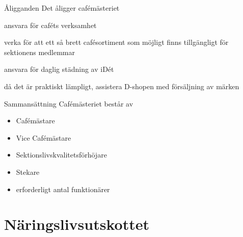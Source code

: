 \documentclass[pdfbookmarks,a4paper,11pt]{article}
\newlength{\itemcollength}
\newenvironment{reglemlista}{%
  \begin{list}{}{%
      \setlength{\labelwidth}{\itemcollength}%
      \setlength{\leftmargin}{\labelwidth + \labelsep}%
      \renewcommand{\makelabel}[1]{%
        \raisebox{0pt}[1ex][0pt]{%
          \makebox[\labelwidth][l]{%
            \parbox[t]{\itemcollength}{%
              \raggedright\hspace{0pt}##1}}}\hfill}%
      }}{%
  \end{list}}
\begin{document}
\begin{reglemlista}

  \item[Åligganden]
    Det åligger cafémästeriet
    \begin{attlista}
      \item ansvara för caféts verksamhet
      \item verka för att ett så brett cafésortiment som möjligt finns tillgängligt för sektionens medlemmar
      \item ansvara för daglig städning av iDét
      \item då det är praktiskt lämpligt, assistera D-shopen med försäljning av märken
    \end{attlista}

  \item[Sammansättning]
    Cafémästeriet består av
    \begin{itemize}
      \item Cafémästare
      \item Vice Cafémästare
      \item Sektionslivskvalitetsförhöjare
      \item Stekare
      \item erforderligt antal funktionärer
    \end{itemize}

  

\end{reglemlista}


\section{Näringslivsutskottet}
\end{document}
